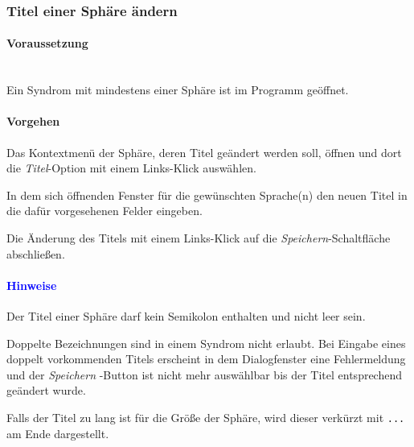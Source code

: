 \documentclass[enabledeprecatedfontcommands,fontsize=11pt,paper=a4,twoside]{scrartcl}
\newcounter{one}
\newcounter{two}[one]
\newcommand*{\hint}{\paragraph{\textcolor{blue}{Hinweise}}}
\newcommand*{\condition}{\paragraph{Voraussetzung}$\;$ \vspace{0.2cm}\\}
\newcommand*{\action}{\paragraph{Vorgehen}}
\let\tempone\itemize
\let\temptwo\enditemize
\renewenvironment{itemize}{\tempone\addtolength{\itemsep}{-10.0pt}}{\temptwo}
\let\origenumerate\enumerate
\let\origendenumerate\endenumerate
\renewenvironment{enumerate}{\origenumerate \addtolength{\itemsep}{-10.0pt}}{\origendenumerate}
\begin{document}
\subsubsection{Titel einer Sphäre ändern}
				\condition 	
		Ein Syndrom mit mindestens einer Sphäre ist im Programm geöffnet. 
		\action  
		\begin{enumerate}
			\item Das Kontextmenü der Sphäre, deren Titel geändert werden soll, öffnen und dort die \textit{Titel}-Option mit einem Links-Klick auswählen. 
			\item In dem sich öffnenden Fenster für die gewünschten Sprache(n) den neuen Titel in die dafür vorgesehenen Felder eingeben.
			\item Die Änderung des Titels mit einem Links-Klick auf die \textit{Speichern}-Schaltfläche abschließen.
		\end{enumerate}
		\hint
		\begin{itemize}
			\item Der Titel einer Sphäre darf kein Semikolon enthalten und nicht leer sein.
			\item Doppelte Bezeichnungen sind in einem Syndrom nicht erlaubt. Bei Eingabe eines doppelt vorkommenden Titels erscheint in dem Dialogfenster eine Fehlermeldung und der \textit{Speichern} -Button ist nicht mehr auswählbar bis der Titel entsprechend geändert wurde. 
			\item Falls der Titel zu lang ist für die Größe der Sphäre, wird dieser verkürzt mit \texttt{...} am Ende dargestellt.\\
		\end{itemize}	
			
\end{document}
